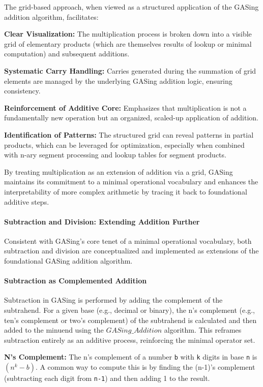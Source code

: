 The grid-based approach, when viewed as a structured application of the GASing addition algorithm, facilitates:


\noindent\textbf{\textbf{Clear Visualization}:} The multiplication process is broken down into a visible grid of elementary products (which are themselves results of lookup or minimal computation) and subsequent additions.


\noindent\textbf{\textbf{Systematic Carry Handling}:} Carries generated during the summation of grid elements are managed by the underlying GASing addition logic, ensuring consistency.


\noindent\textbf{\textbf{Reinforcement of Additive Core}:} Emphasizes that multiplication is not a fundamentally new operation but an organized, scaled-up application of addition.


\noindent\textbf{\textbf{Identification of Patterns}:} The structured grid can reveal patterns in partial products, which can be leveraged for optimization, especially when combined with n-ary segment processing and lookup tables for segment products.


By treating multiplication as an extension of addition via a grid, GASing maintains its commitment to a minimal operational vocabulary and enhances the interpretability of more complex arithmetic by tracing it back to foundational additive steps.
\paragraph{Subtraction and Division: Extending Addition Further}

Consistent with GASing's core tenet of a minimal operational vocabulary, both subtraction and division are conceptualized and implemented as extensions of the foundational GASing addition algorithm.
\paragraph{Subtraction as Complemented Addition}

Subtraction in GASing is performed by adding the complement of the subtrahend. For a given base (e.g., decimal or binary), the n's complement (e.g., ten's complement or two's complement) of the subtrahend is calculated and then added to the minuend using the \texttt{$GASing\_{Addition}$} algorithm. This reframes subtraction entirely as an additive process, reinforcing the minimal operator set.


\noindent\textbf{\textbf{N's Complement:} } The n's complement of a number \texttt{b} with \texttt{k} digits in base \texttt{n} is \texttt{$(n^{k} - b)$}. A common way to compute this is by finding the (n-1)'s complement (subtracting each digit from \texttt{n-1}) and then adding 1 to the result.


